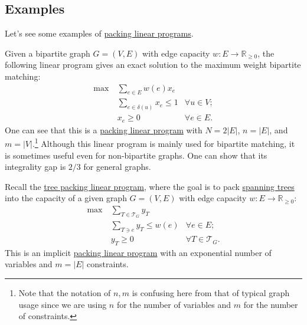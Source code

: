 \subsection{Examples}
Let's see some examples of \hyperref[def:packing-LP]{packing linear programs}.

\begin{eg}
	Given a bipartite graph \(G = (V, E)\) with edge capacity \(w \colon E \to \mathbb{R} _{\geq 0}\), the following linear program gives an exact solution to the maximum weight bipartite matching:
	\[
		\begin{aligned}
			\max~ & \sum_{e \in E} w(e) x_e                                \\
			      & \sum_{e \in \delta (u)} x_e \leq 1 & \forall u \in V ; \\
			      & x_e \geq 0                         & \forall e \in E.
		\end{aligned}
	\]
	One can see that this is a \hyperref[def:packing-LP]{packing linear program} with \(N = 2 \lvert E \rvert \), \(n = \lvert E \rvert \), and \(m = \lvert V \rvert \).\footnote{Note that the notation of \(n, m\) is confusing here from that of typical graph usage since we are using \(n\) for the number of variables and \(m\) for the number of constraints.} Although this linear program is mainly used for bipartite matching, it is sometimes useful even for non-bipartite graphs. One can show that its integrality gap is \(2 / 3\) for general graphs.
\end{eg}

\begin{eg}
	Recall the \hyperref[eq:tree-packing-LP]{tree packing linear program}, where the goal is to pack \hyperref[def:spanning-tree]{spanning trees} into the capacity of a given graph \(G = (V, E)\) with edge capacity \(w \colon E \to \mathbb{R} _{\geq 0}\):
	\[
		\begin{aligned}
			\max~ & \sum_{T \in \mathcal{T} _G} y_T                                 \\
			      & \sum_{T \ni e} y_T \leq w(e)    & \forall e \in E;              \\
			      & y_T \geq 0                      & \forall T \in \mathcal{T} _G.
		\end{aligned}
	\]
	This is an implicit \hyperref[def:packing-LP]{packing linear program} with an exponential number of variables and \(m = \lvert E \rvert \) constraints.
\end{eg}

